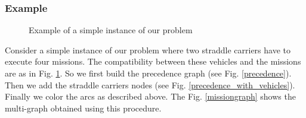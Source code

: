 \documentclass[journal]{IEEEtran}
\let\MYoriglatexcaption\caption
\renewcommand{\caption}[2][\relax]{\MYoriglatexcaption[#2]{#2}}
\begin{document}
\subsubsection{Example}
\medskip
\begin{figure}[h]
	\caption{Example of a simple instance of our problem}
	\label{problem_description}
\end{figure}

Consider a simple instance of our problem where two straddle carriers have to
execute four missions. The compatibility between these vehicles and the missions
are as in Fig. \ref{problem_description}. So we first build the precedence graph
(see Fig. \ref{precedence}). Then we add the straddle carriers nodes (see Fig.
\ref{precedence_with_vehicles}). Finally we color the arcs as described above.
The Fig. \ref{missiongraph} shows the multi-graph obtained using this procedure.\\
\end{document}
